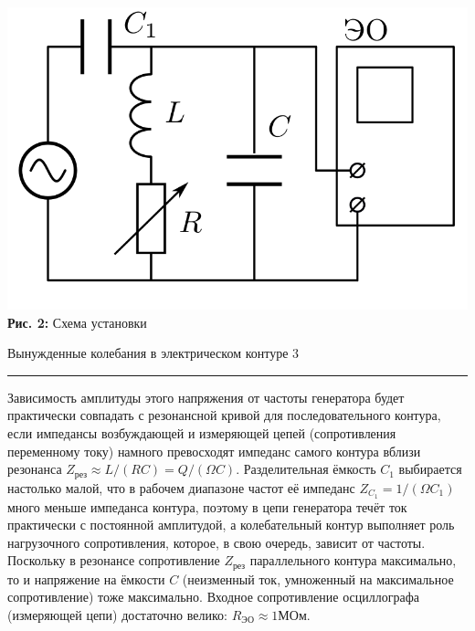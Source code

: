 \documentclass[12pt,a4paper]{scrartcl}
\begin{document}
	\begin{center}
		\includegraphics[scale=0.2]{PIC_2}
		\\\textbf{Рис. 2:} Схема установки
	\end{center}
	
	\newpage 
	
	
	\begin{flushleft}
		\footnotesize{Вынужденные колебания в электрическом контуре} \hspace{\fill} \footnotesize{3}
		\\[-0.3cm]\noindent\rule{\textwidth}{0.3pt}
	\end{flushleft}
	
	Зависимость амплитуды этого напряжения от частоты генератора будет практически совпадать с резонансной кривой для последовательного контура, если импедансы возбуждающей и измеряющей цепей (сопротивления переменному току) намного превосходят импеданс самого контура вблизи резонанса $Z_\text{рез} \approx L / (RC) = Q / (\Omega C)$. Разделительная ёмкость $C_1$ выбирается настолько малой, что в рабочем диапазоне частот её импеданс $Z_{C_1} = 1/(\Omega C_1)$ много меньше импеданса контура, поэтому в цепи генератора течёт ток практически с постоянной амплитудой, а колебательный контур выполняет роль нагрузочного сопротивления, которое, в свою очередь, зависит от частоты. Поскольку в резонансе сопротивление $Z_\text{рез}$ параллельного контура максимально, то и напряжение на ёмкости $C$ (неизменный ток, умноженный на максимальное сопротивление) тоже максимально. Входное сопротивление осциллографа (измеряющей цепи) достаточно велико: $R_\text{ЭО} \approx 1 \text{МОм}$.
	
\end{document}
